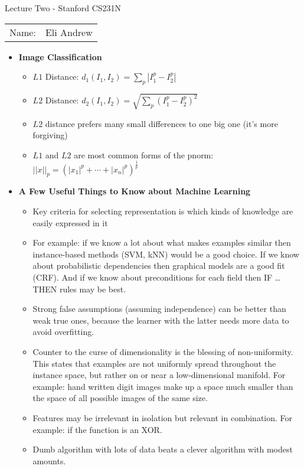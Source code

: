 \documentclass[12pt]{article}
\begin{document}
\begin{center}
{\Large Lecture Two - Stanford CS231N}

\begin{tabular}{rl}
Name: & Eli Andrew
\end{tabular}
\end{center}

  \begin{itemize}
    \item \textbf{Image Classification}
    \begin{itemize}
        \item $L1$ Distance: $d_1(I_1, I_2) = \sum\limits_{p}|I^p_1 - I^p_2|$
        \item $L2$ Distance: $d_2(I_1, I_2) = \sqrt{\sum\limits_{p}(I^p_1 - I^p_2)^2}$
        \item $L2$ distance prefers many small differences to one big one (it's more forgiving)
        \item $L1$ and $L2$ are most common forms of the pnorm: $||x||_p = (|x_1|^p + \dotsb + |x_n|^p)^{\frac{1}{p}}$
    \end{itemize}
    \item \textbf{A Few Useful Things to Know about Machine Learning}
    \begin{itemize}
        \item Key criteria for selecting representation is which kinds of knowledge are easily expressed in it
        \item For example: if we know a lot about what makes examples similar then instance-based methods (SVM, kNN)
        would be a good choice. If we know about probabilistic dependencies then graphical models are a good fit (CRF).
        And if we know about preconditions for each field then IF \dots THEN rules may be best.
        \item Strong false assumptions (assuming independence) can be better than weak true ones, because the learner with
        the latter needs more data to avoid overfitting.
        \item Counter to the curse of dimensionality is the blessing of non-uniformity. This states that examples are not
        uniformly spread throughout the instance space, but rather on or near a low-dimensional manifold. For example: hand written  
        digit images make up a space much smaller than the space of all possible images of the same size.
        \item Features may be irrelevant in isolation but relevant in combination. For example: if the function is an XOR.
        \item Dumb algorithm with lots of data beats a clever algorithm with modest amounts.


\end{itemize}
\end{itemize}
\end{document}
